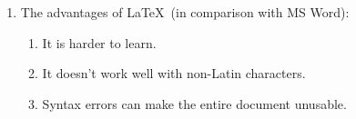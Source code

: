 \documentclass[12pt, letterpaper]{article}
\begin{document}
\begin{enumerate}
\begin{enumerate}
		\end{enumerate}

      

	\item The advantages of \LaTeX~(in comparison with MS Word):
		\begin{enumerate}
			\item It is harder to learn.
			\item It doesn't work well with non-Latin characters.
			\item Syntax errors can make the entire document unusable.
		\end{enumerate}
		
\end{enumerate}
\end{document}
